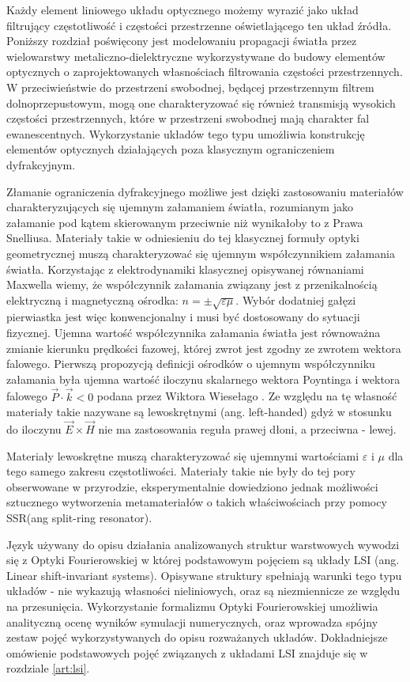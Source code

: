 Każdy element liniowego układu optycznego możemy wyrazić jako układ filtrujący częstotliwość i częstości przestrzenne oświetlającego ten układ źródła. Poniższy rozdział poświęcony jest modelowaniu propagacji światła przez wielowarstwy metaliczno-dielektryczne wykorzystywane do  budowy elementów optycznych o zaprojektowanych własnościach filtrowania częstości przestrzennych. W przeciwieństwie do przestrzeni swobodnej, będącej przestrzennym filtrem dolnoprzepustowym, mogą one charakteryzować się również transmisją wysokich częstości przestrzennych, które w przestrzeni swobodnej mają charakter fal ewanescentnych. Wykorzystanie układów tego typu umożliwia konstrukcję elementów optycznych działających poza klasycznym ograniczeniem dyfrakcyjnym.

Złamanie ograniczenia dyfrakcyjnego możliwe jest dzięki zastosowaniu materiałów charakteryzujących się ujemnym załamaniem światła, rozumianym jako załamanie pod kątem skierowanym przeciwnie niż wynikałoby to z Prawa Snelliusa. Materiały takie w odniesieniu do tej klasycznej formuły optyki geometrycznej muszą charakteryzować się ujemnym współczynnikiem załamania światła. Korzystając z elektrodynamiki klasycznej opisywanej równaniami Maxwella wiemy, że współczynnik załamania związany jest z przenikalnością elektryczną i magnetyczną ośrodka: $n = \pm \sqrt{ \varepsilon \mu}$. Wybór dodatniej gałęzi pierwiastka jest więc konwencjonalny i musi być dostosowany do sytuacji fizycznej. Ujemna wartość współczynnika załamania światła jest równoważna zmianie kierunku prędkości fazowej, której zwrot jest zgodny ze zwrotem wektora falowego. Pierwszą propozycją definicji ośrodków o ujemnym współczynniku załamania była ujemna wartość iloczynu skalarnego wektora Poyntinga i wektora falowego $\vec{P} \cdot \vec{k} < 0$ podana przez Wiktora Wiesełago \cite{veselago1968electrodynamics}. Ze względu na tę własność materiały takie nazywane są lewoskrętnymi (ang. left-handed) gdyż w stosunku do iloczynu $\vec{E} \times \vec{H}$ nie ma zastosowania reguła prawej dłoni, a przeciwna - lewej.

Materiały lewoskrętne muszą charakteryzować się ujemnymi wartościami $\varepsilon$ i $\mu$ dla tego samego zakresu częstotliwości. Materiały takie nie były do tej pory obserwowane w przyrodzie, eksperymentalnie dowiedziono jednak możliwości sztucznego wytworzenia metamateriałów o takich właściwościach\cite{PhysRevLett.84.4184} przy pomocy SSR(ang split-ring resonator). 

Język używany do opisu działania analizowanych struktur warstwowych wywodzi się z Optyki Fourierowskiej w której podstawowym pojęciem są układy LSI (ang. Linear shift-invariant systems). Opisywane struktury spełniają warunki tego typu układów - nie wykazują własności nieliniowych, oraz są niezmiennicze ze względu na przesunięcia. Wykorzystanie formalizmu Optyki Fourierowskiej umożliwia analityczną ocenę wyników symulacji numerycznych, oraz wprowadza spójny zestaw pojęć wykorzystywanych do opisu rozważanych układów. Dokładniejsze omówienie podstawowych pojęć związanych z układami LSI znajduje się w rozdziale \ref{art:lsi}.


